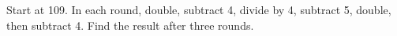 Start at 109. In each round, double, subtract 4, divide by 4, subtract 5, double, then subtract 4. Find the result after three rounds.
